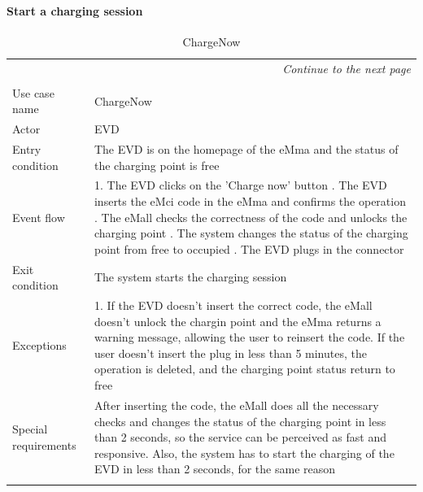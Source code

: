 \paragraph{Start a charging session}
\begin{center}
    \begin{longtable}{p{4cm} p{11cm}}
    \multicolumn{2}{r}{\itshape{Continue to the next page}}\\
    \endfoot 
    \\
    \endlastfoot
    \hline
     Use case name &  ChargeNow\\
     \hline
     Actor & EVD \\
     \hline
     Entry condition & The EVD is on the homepage of the eMma and the status of the charging point is free \\
     \hline
     Event flow &   1. The EVD clicks on the 'Charge now' button \newline
                    2. The EVD inserts the eMci code in the eMma and confirms the operation \newline
                    3. The eMall checks the correctness of the code and unlocks the charging point \newline
                    4. The system changes the status of the charging point from free to occupied \newline   
                    5. The EVD plugs in the connector \\
     \hline
     Exit condition &  The system starts the charging session \\
     \hline
     Exceptions &   1. If the EVD doesn't insert the correct code, the eMall doesn't unlock the chargin                         point and the eMma returns a warning message, allowing the user to reinsert the                         code\newline
                    2. If the user doesn't insert the plug in less than 5 minutes, the operation is deleted, and the charging point status return to free \\ 
     \hline
     Special requirements & After inserting the code, the eMall does all the necessary checks and changes the status of the charging point in less than 2 seconds, so the service can be perceived as fast and responsive. Also, the system has to start the charging of the EVD in less than 2 seconds, for the same reason \\
     \hline
    \caption{ChargeNow}
    \label{tab:ChargeNow}
    \end{longtable}
\end{center}

